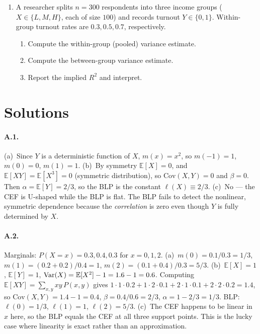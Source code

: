 \documentclass{article}
\newcommand{\E}{\mathbb{E}}
\begin{document}
\begin{enumerate}[label=\textbf{D.\arabic*},leftmargin=*,itemsep=10pt]
\item A researcher splits $n = 300$ respondents into three income groups ($X \in \{L, M, H\}$, each of size $100$) and records turnout $Y \in \{0, 1\}$.  Within-group turnout rates are $0.3, 0.5, 0.7$, respectively.
\begin{enumerate}[label=(\alph*)]
  \item Compute the within-group (pooled) variance estimate.
  \item Compute the between-group variance estimate.
  \item Report the implied $R^2$ and interpret.
\end{enumerate}

\end{enumerate}

\newpage

\section*{Solutions}

\paragraph{A.1.}  (a)~Since $Y$ is a deterministic function of $X$, $m(x) = x^2$, so $m(-1)=1$, $m(0)=0$, $m(1)=1$.  (b)~By symmetry $\E[X]=0$, and $\E[XY] = \E[X^3] = 0$ (symmetric distribution), so $\text{Cov}(X,Y) = 0$ and $\beta = 0$.  Then $\alpha = \E[Y] = 2/3$, so the BLP is the constant $\ell(X) \equiv 2/3$.  (c)~No --- the CEF is U-shaped while the BLP is flat.  The BLP fails to detect the nonlinear, symmetric dependence because the \emph{correlation} is zero even though $Y$ is fully determined by $X$.

\paragraph{A.2.}  Marginals: $P(X=x) = 0.3, 0.4, 0.3$ for $x=0,1,2$.  (a)~$m(0) = 0.1/0.3 = 1/3$, $m(1) = (0.2 + 0.2)/0.4 = 1$, $m(2) = (0.1 + 0.4)/0.3 = 5/3$.  (b)~$\E[X] = 1$, $\E[Y] = 1$, $\Var(X) = \E[X^2] - 1 = 1.6 - 1 = 0.6$.  Computing $\E[XY] = \sum_{x,y} xy\,P(x,y)$ gives $1\cdot 1\cdot 0.2 + 1\cdot 2\cdot 0.1 + 2\cdot 1\cdot 0.1 + 2\cdot 2\cdot 0.2 = 1.4$, so $\text{Cov}(X,Y) = 1.4 - 1 = 0.4$, $\beta = 0.4/0.6 = 2/3$, $\alpha = 1 - 2/3 = 1/3$.  BLP: $\ell(0) = 1/3$, $\ell(1) = 1$, $\ell(2) = 5/3$.  (c)~The CEF happens to be linear in $x$ here, so the BLP equals the CEF at all three support points.  This is the lucky case where linearity is exact rather than an approximation.
\end{document}
